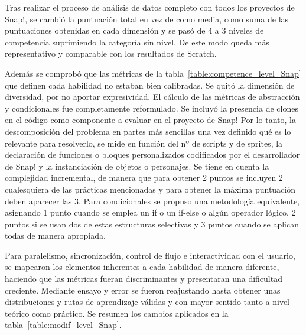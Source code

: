 \documentclass[a4paper, 12pt]{book}
\begin{document}
Tras realizar el proceso de análisis de datos completo con todos los proyectos de Snap!, se cambió la puntuación total en vez de como media, como suma de las puntuaciones obtenidas en cada dimensión y se pasó de 4 a 3 niveles de competencia suprimiendo la categoría sin nivel. De este modo queda más representativo y comparable con los resultados de Scratch.

Además se comprobó que las métricas de la tabla~\ref{table:competence_level_Snap} que definen cada habilidad no estaban bien calibradas. Se quitó la dimensión de diversidad, por no aportar expresividad. El cálculo de las métricas de abstracción y condicionales fue completamente reformulado. Se incluyó la presencia de clones en el código como componente a evaluar en el proyecto de Snap! Por lo tanto, la descomposición del problema en partes más sencillas una vez definido qué es lo relevante para resolverlo, se mide en función del nº de scripts y de sprites, la declaración de funciones o bloques personalizados codificados por el desarrollador de Snap! y la instanciación de objetos o personajes. Se tiene en cuenta la complejidad incremental, de manera que para obtener 2 puntos se incluyen 2 cualesquiera de las prácticas mencionadas y para obtener la máxima puntuación deben aparecer las 3. Para condicionales se propuso una metodología equivalente, asignando 1 punto cuando se emplea un if o un if-else o algún operador lógico, 2 puntos si se usan dos de estas estructuras selectivas y 3 puntos cuando se aplican todas de manera apropiada.

Para paralelismo, sincronización, control de flujo e interactividad con el usuario, se mapearon los elementos inherentes a cada habilidad de manera diferente, haciendo que las métricas fueran discriminantes y presentaran una dificultad creciente. Mediante ensayo y error se fueron reajustando hasta obtener unas distribuciones y rutas de aprendizaje válidas y con mayor sentido tanto a nivel teórico como práctico. Se resumen los cambios aplicados en la tabla~\ref{table:modif_level_Snap}.
\end{document}
